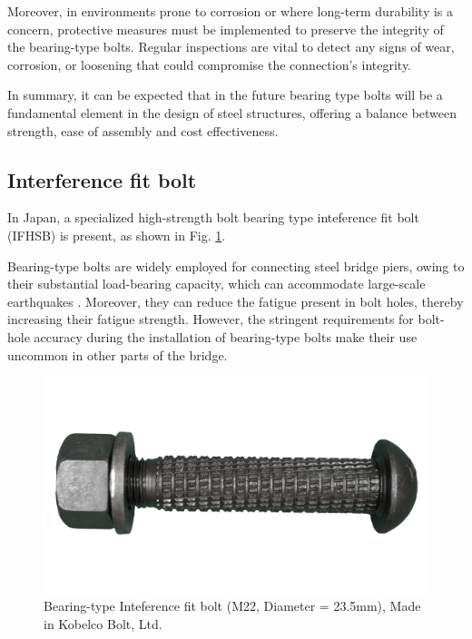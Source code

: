 Moreover, in environments prone to corrosion or where long-term durability is a concern, protective measures must be implemented to preserve the integrity of the bearing-type bolts. Regular inspections are vital to detect any signs of wear, corrosion, or loosening that could compromise the connection's integrity.

In summary, it can be expected that in the future bearing type bolts will be a fundamental element in the design of steel structures, offering a balance between strength, ease of assembly and cost effectiveness.

\subsection{Interference fit bolt}

In Japan, a specialized high-strength bolt bearing type inteference fit bolt (\ac{IFHSB}) is present, as shown in Fig. \ref{fig-onebbolt}. 

Bearing-type bolts are widely employed for connecting steel bridge piers, owing to their substantial load-bearing capacity, which can accommodate large-scale earthquakes \cite{Guo20205}. Moreover, they can reduce the fatigue present in bolt holes, thereby increasing their fatigue strength. However, the stringent requirements for bolt-hole accuracy during the installation of bearing-type bolts make their use uncommon in other parts of the bridge.



\begin{figure}
    \centering
    \includegraphics[width=0.8\linewidth]{imgs/ch2/oneBbolt.png}
    \caption{Bearing-type Inteference fit bolt (M22, Diameter = 23.5mm), Made in Kobelco Bolt, Ltd.}
    \label{fig-onebbolt}
\end{figure}


